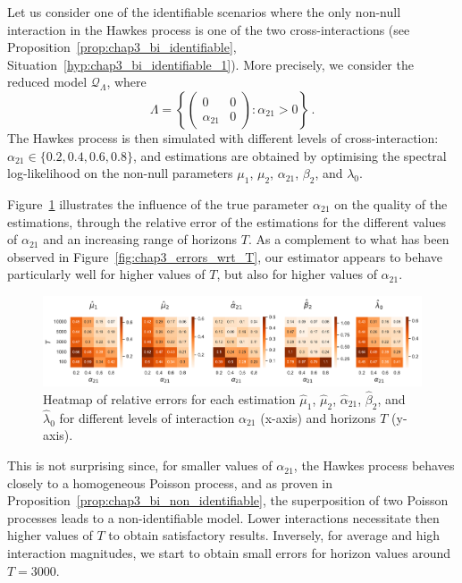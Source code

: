         Let us consider one of the identifiable scenarios where the only non-null interaction in the Hawkes process is one of the two cross-interactions (see Proposition~\ref{prop:chap3_bi_identifiable}, Situation~\ref{hyp:chap3_bi_identifiable_1}).
        More precisely, we consider the reduced model $\mathcal{Q}_{\Lambda}$,
        where
        \[
          \Lambda = \left\{ \begin{pmatrix} 0 & 0 \\ \alpha_{21} & 0 \end{pmatrix} : \alpha_{21} > 0 \right\} \,.
        \]
        The Hawkes process is then simulated with different levels of cross-interaction: $\alpha_{21} \in \{0.2, 0.4, 0.6, 0.8\}$,
        and estimations are obtained by optimising the spectral log-likelihood on the non-null parameters $\mu_1$, $\mu_2$, $\alpha_{21}$, $\beta_2$, and $\lambda_0$.
        
        Figure~\ref{fig:chap3_bi_phase_transition} illustrates the influence of the true parameter $\alpha_{21}$ on the quality of the estimations,
	      through the relative error of the estimations for the different values of $\alpha_{21}$ and 
	      an increasing range of horizons $T$.
	      As a complement to what has been observed in Figure~\ref{fig:chap3_errors_wrt_T},
	      our estimator appears to behave particularly well for higher values of $T$, but also for higher values of $\alpha_{21}$.


        \begin{figure}[!ht]
			\centering
			\includegraphics[width=\linewidth]{images/chapter4//phase_transition.pdf}
 		   	\caption{Heatmap of relative errors for each estimation $\hat\mu_1$, $\hat\mu_2$, $\hat\alpha_{21}$, $\hat\beta_2$, and $\hat\lambda_0$ for different levels of interaction $\alpha_{21}$ (x-axis) and horizons $T$ (y-axis).}
 		  \label{fig:chap3_bi_phase_transition}
		\end{figure}
        
        This is not surprising since, for smaller values of $\alpha_{21}$, the Hawkes process behaves closely to a homogeneous Poisson process, and as proven in Proposition~\ref{prop:chap3_bi_non_identifiable}, the superposition of two Poisson processes leads to a non-identifiable model. Lower interactions necessitate then higher values of $T$ to obtain satisfactory results. Inversely, for average and high interaction magnitudes, we start to obtain small errors for horizon values around $T=3000$. 
		
